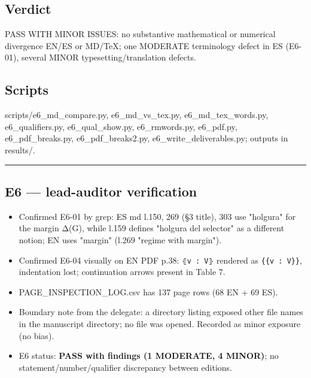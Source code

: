 \documentclass[
]{article}
\providecommand{\tightlist}{%
  \setlength{\itemsep}{0pt}\setlength{\parskip}{0pt}}
\begin{document}
\subsection{Verdict}\label{verdict}

PASS WITH MINOR ISSUES: no substantive mathematical or numerical
divergence EN/ES or MD/TeX; one MODERATE terminology defect in ES
(E6-01), several MINOR typesetting/translation defects.

\subsection{Scripts}\label{scripts}

scripts/e6\_md\_compare.py, e6\_md\_vs\_tex.py, e6\_md\_tex\_words.py,
e6\_qualifiers.py, e6\_qual\_show.py, e6\_rmwords.py, e6\_pdf.py,
e6\_pdf\_breaks.py, e6\_pdf\_breaks2.py, e6\_write\_deliverables.py;
outputs in results/.

\begin{center}\rule{0.5\linewidth}{0.5pt}\end{center}

\subsection{E6 --- lead-auditor
verification}\label{e6--lead-auditor-verification}

\begin{itemize}
\tightlist
\item
  Confirmed E6-01 by grep: ES md l.150, 269 (§3 title), 303 use
  "holgura" for the margin Δ(G), while l.159 defines "holgura del
  selector" as a different notion; EN uses "margin" (l.269 "regime with
  margin").
\item
  Confirmed E6-04 visually on EN PDF p.38: \texttt{⦃v\ :\ V⦄} rendered
  as \texttt{\{\{v\ :\ V\}\}}, indentation lost; continuation arrows
  present in Table 7.
\item
  PAGE\_INSPECTION\_LOG.csv has 137 page rows (68 EN + 69 ES).
\item
  Boundary note from the delegate: a directory listing exposed other
  file names in the manuscript directory; no file was opened. Recorded
  as minor exposure (no bias).
\item
  E6 status: \textbf{PASS with findings (1 MODERATE, 4 MINOR)}; no
  statement/number/qualifier discrepancy between editions.
\end{itemize}
\end{document}
